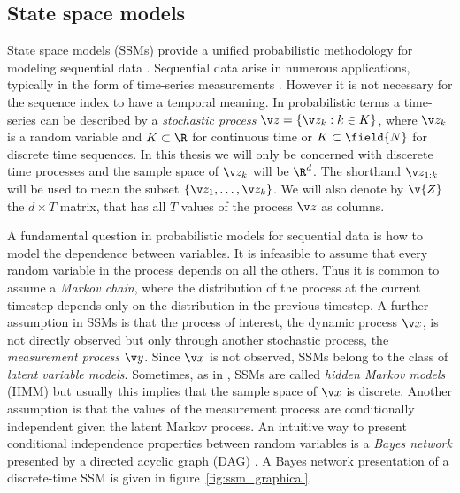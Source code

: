 \subsection{State space models}

State space models (SSMs) provide a unified probabilistic methodology for modeling
sequential data \parencite{ljung1994modeling,durbin2012time,Cappe2005,barber2011bayesian}. Sequential data arise in numerous applications, typically in the form
of time-series measurements . However it is not necessary for the sequence index to have
a temporal meaning. In probabilistic terms a time-series
can be described by a \emph{stochastic process} $\z = \left\{\z_k:k\in K\right\}$, where $\z_k$ is a random
variable and $K\subset\R$ for continuous time or $K\subset\field{N}$ for discrete time sequences. 
In this thesis we will only be concerned with discerete time processes and the sample space of $\z_k$ will be $\R^d$. 
The shorthand $\z_{1:k}$ will be used to mean the subset $\{\z_1,\dots,\z_k\}$. We will also
denote by $\v{Z}$ the $d\times T$ matrix, that has all $T$ values of the process $\z$ as columns.

A fundamental question in probabilistic models for sequential data is how 
to model the dependence between variables. It is infeasible to assume
that every random variable in the process depends on all the others.
Thus it is common to assume a \emph{Markov chain}, where the distribution of
the process at the current timestep depends only on the distribution in the previous timestep.
A further assumption in SSMs is that the process of interest, the dynamic process $\x$, is not directly observed
but only through another stochastic process, the \emph{measurement process} $\y$. Since
$\x$ is not observed, SSMs belong to the class of \emph{latent variable models}. Sometimes, as in
\cite{Cappe2005}, SSMs are called \emph{hidden Markov models} (HMM) but usually this implies that
the sample space of $\x$ is discrete. Another assumption is that the values of the measurement process are conditionally independent
given the latent Markov process.
An intuitive way to present conditional independence properties between random
variables is a \emph{Bayes network} presented by a directed acyclic graph (DAG) \parencite{pearl1988probabilistic,Bishop2006}.
A Bayes network presentation of a discrete-time SSM is given in figure~\ref{fig:ssm_graphical}.

